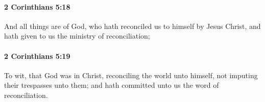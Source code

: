 		\paragraph{2 Corinthians 5:18} %
			\label{2CORINTHIANS-5-18}

			And all things are of God, who hath reconciled us to himself by Jesus Christ, and hath given to us the ministry of reconciliation;

			\begin{framed}
			\scriptsize
				\begin{compactdesc}
					\item[SBLG]  \hyperref[KATALLASSO]{}  \hyperref[KATALLAGE]{}\gr{,}
				\end{compactdesc}
			\end{framed}

		\paragraph{2 Corinthians 5:19} %
			\label{2CORINTHIANS-5-19}

			To wit, that God was in Christ, reconciling the world unto himself, not imputing their trespasses unto them; and hath committed unto us the word of reconciliation.

